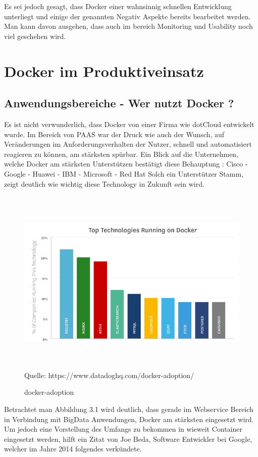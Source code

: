 \documentclass[12pt,toc=bib,toc=listof]{scrreprt}
\begin{document}
Es sei jedoch gesagt, dass Docker einer wahnsinnig schnellen Entwicklung unterliegt und einige der genannten Negativ Aspekte bereits bearbeitet werden.
Man kann davon ausgehen, dass auch im bereich Monitoring und Usability noch viel geschehen wird.


\chapter{Docker im Produktiveinsatz}
\section{Anwendungsbereiche - Wer nutzt Docker ?}
Es ist nicht verwunderlich, dass Docker von einer Firma wie dotCloud entwickelt wurde.
Im Bereich von PAAS war der Druck wie auch der Wunsch, auf Veränderungen im Anforderungsverhalten der Nutzer, schnell und automatisiert reagieren zu können, am stärksten spürbar. 
Ein Blick auf die Unternehmen, welche Docker am stärksten Unterstützen bestätigt diese Behauptung :
Cisco - Google - Huawei - IBM - Microsoft - Red Hat
Solch ein Unterstützer Stamm, zeigt deutlich wie wichtig diese Technology in Zukunft sein wird.

\begin{figure}
	\centering
	\caption{docker-adoption}
	\includegraphics[width=15cm, height=9cm, scale=0.3]{docker-adoption.png}
	Quelle: https://www.datadoghq.com/docker-adoption/
\end{figure}

Betrachtet man Abbildung 3.1 wird deutlich, dass gerade im Webservice Bereich in Verbindung mit BigData Anwendungen, Docker am stärksten eingesetzt wird.
Um jedoch eine Vorstellung des Umfangs zu bekommen in wieweit Container eingesetzt werden, hilft ein Zitat von Joe Beda, Software Entwickler bei Google, welcher im Jahre 2014 folgendes verkündete.
\end{document}
